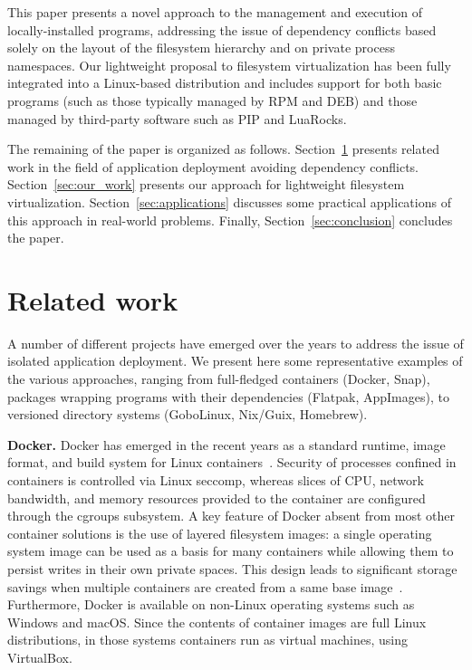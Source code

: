 \documentclass[sigplan, anonymous, 10pt]{acmart}
\begin{document}
This paper presents a novel approach to the management and execution of
locally-installed programs, addressing the issue of dependency conflicts based
solely on the layout of the filesystem hierarchy and on private process
namespaces. Our lightweight proposal to filesystem virtualization has been
fully integrated into a Linux-based distribution and includes support for both
basic programs (such as those typically managed by RPM and DEB) and those
managed by third-party software such as PIP and LuaRocks.

The remaining of the paper is organized as follows.
Section~\ref{sec:prior_art} presents related work in the field of application
deployment avoiding dependency conflicts. Section~\ref{sec:our_work} presents
our approach for lightweight filesystem virtualization.
Section~\ref{sec:applications} discusses some practical applications of this
approach in real-world problems. Finally, Section~\ref{sec:conclusion}
concludes the paper.

\section{Related work}\label{sec:prior_art}
A number of different projects have emerged over the years to address the issue of
isolated application deployment. We present here some representative examples of
the various approaches, ranging from full-fledged containers (Docker, Snap),
packages wrapping programs with their dependencies (Flatpak, AppImages),
to versioned directory systems (GoboLinux, Nix/Guix, Homebrew).

\textbf{Docker.}
Docker has emerged in the recent years as a standard runtime, image format, and build
system for Linux containers~\cite{fink2014:docker}. Security of processes confined in
containers is controlled via Linux seccomp, whereas slices of CPU, network bandwidth,
and memory resources provided to the container are configured through the cgroups
subsystem. A key feature of Docker
absent from most other container solutions is the use of layered filesystem images:
a single operating system image can be used as a basis for many containers while allowing
them to persist writes in their own private spaces. This design leads to significant
storage savings when multiple containers are created from a same base
image~\cite{felter2015:comparison}.
Furthermore, Docker is available on non-Linux operating systems such as Windows and
macOS. Since the contents of container images are full Linux distributions, in
those systems containers run as virtual machines, using VirtualBox.
\end{document}
